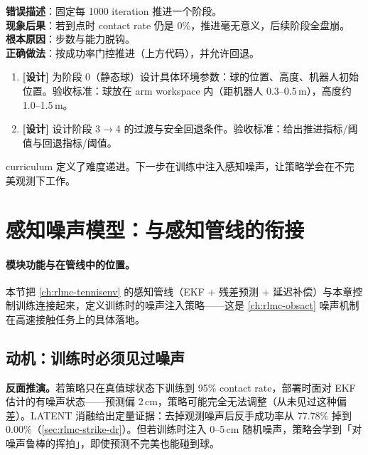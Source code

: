 \begin{pitfall}
\textbf{错误描述}：固定每 1000 iteration 推进一个阶段。\\
\textbf{现象后果}：若到点时 contact rate 仍是 0\%，推进毫无意义，后续阶段全盘崩。\\
\textbf{根本原因}：步数与能力脱钩。\\
\textbf{正确做法}：按成功率门控推进（上方代码），并允许回退。
\end{pitfall}

\begin{practice}[本节动手任务]
\begin{enumerate}
  \item \textbf{[设计]} 为阶段 0（静态球）设计具体环境参数：球的位置、高度、机器人初始位置。验收标准：球放在 arm workspace 内（距机器人 0.3--0.5\,m），高度约 1.0--1.5\,m。
  \item \textbf{[设计]} 设计阶段 3$\to$4 的过渡与安全回退条件。验收标准：给出推进指标/阈值与回退指标/阈值。
\end{enumerate}
\end{practice}

\noindent{}curriculum 定义了难度递进。下一步在训练中注入感知噪声，让策略学会在不完美观测下工作。

\section{感知噪声模型：与感知管线的衔接}
\label{sec:rlmc-strike-noise}

\paragraph{模块功能与在管线中的位置。}本节把 \cref{ch:rlmc-tennisenv} 的感知管线（EKF $+$ 残差预测 $+$ 延迟补偿）与本章控制训练连接起来，定义训练时的噪声注入策略——这是 \cref{ch:rlmc-obsact} 噪声机制在高速接触任务上的具体落地。

\subsection{动机：训练时必须见过噪声}

\textbf{反面推演。}若策略只在真值球状态下训练到 95\% contact rate，部署时面对 EKF 估计的有噪声状态——预测偏 2\,cm，策略可能完全无法调整（从未见过这种偏差）。LATENT 消融给出定量证据：去掉观测噪声后反手成功率从 77.78\% 掉到 0.00\%（\cref{sec:rlmc-strike-dr}）。但若训练时注入 0--5\,cm 随机噪声，策略会学到「对噪声鲁棒的挥拍」，即使预测不完美也能碰到球。

